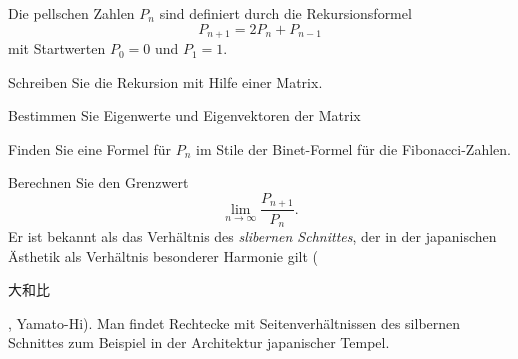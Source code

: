 Die pellschen Zahlen $P_n$ sind definiert durch die Rekursionsformel
\begin{equation}
P_{n+1} = 2P_n + P_{n-1}
\label{80000046:rekursion}
\end{equation}
mit Startwerten $P_0=0$ und $P_1=1$.
\begin{teilaufgaben}
\item
Schreiben Sie die Rekursion mit Hilfe einer Matrix.
\item
Bestimmen Sie Eigenwerte und Eigenvektoren der Matrix
\item
Finden Sie eine Formel für $P_n$ im Stile der Binet-Formel für die
Fibonacci-Zahlen.
\item
Berechnen Sie den Grenzwert
\[
\lim_{n\to \infty} \frac{P_{n+1}}{P_n}.
\]
Er ist bekannt als das Verhältnis des {\em slibernen Schnittes}, der
in der japanischen Ästhetik als Verhältnis besonderer Harmonie gilt
(\begin{CJK}{UTF8}{min}大和比\end{CJK}, Yamato-Hi).
Man findet Rechtecke mit Seitenverhältnissen des silbernen Schnittes
zum Beispiel in der Architektur japanischer Tempel.
\end{teilaufgaben}


